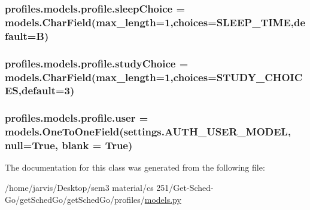 \subsubsection[{\texorpdfstring{sleep\+Choice}{sleepChoice}}]{\setlength{\rightskip}{0pt plus 5cm}profiles.\+models.\+profile.\+sleep\+Choice = models.\+Char\+Field(max\+\_\+length=1,choices={\bf S\+L\+E\+E\+P\+\_\+\+T\+I\+ME},default=\textquotesingle{}B\textquotesingle{})\hspace{0.3cm}{\ttfamily [static]}}\hypertarget{classprofiles_1_1models_1_1profile_a485c5a9cd3e313b41885211790de2bb5}{}\label{classprofiles_1_1models_1_1profile_a485c5a9cd3e313b41885211790de2bb5}
\subsubsection[{\texorpdfstring{study\+Choice}{studyChoice}}]{\setlength{\rightskip}{0pt plus 5cm}profiles.\+models.\+profile.\+study\+Choice = models.\+Char\+Field(max\+\_\+length=1,choices={\bf S\+T\+U\+D\+Y\+\_\+\+C\+H\+O\+I\+C\+ES},default=\textquotesingle{}3\textquotesingle{})\hspace{0.3cm}{\ttfamily [static]}}\hypertarget{classprofiles_1_1models_1_1profile_abeca72fd053b0c5f75b3927194bcd809}{}\label{classprofiles_1_1models_1_1profile_abeca72fd053b0c5f75b3927194bcd809}
\subsubsection[{\texorpdfstring{user}{user}}]{\setlength{\rightskip}{0pt plus 5cm}profiles.\+models.\+profile.\+user = models.\+One\+To\+One\+Field(settings.\+A\+U\+T\+H\+\_\+\+U\+S\+E\+R\+\_\+\+M\+O\+D\+EL, null=True, blank = True)\hspace{0.3cm}{\ttfamily [static]}}\hypertarget{classprofiles_1_1models_1_1profile_a00f2d160ad2e122d55addaa6f43e9aab}{}\label{classprofiles_1_1models_1_1profile_a00f2d160ad2e122d55addaa6f43e9aab}


The documentation for this class was generated from the following file\+:\begin{DoxyCompactItemize}
\item 
/home/jarvis/\+Desktop/sem3 material/cs 251/\+Get-\/\+Sched-\/\+Go/get\+Sched\+Go/get\+Sched\+Go/profiles/\hyperlink{profiles_2models_8py}{models.\+py}\end{DoxyCompactItemize}
